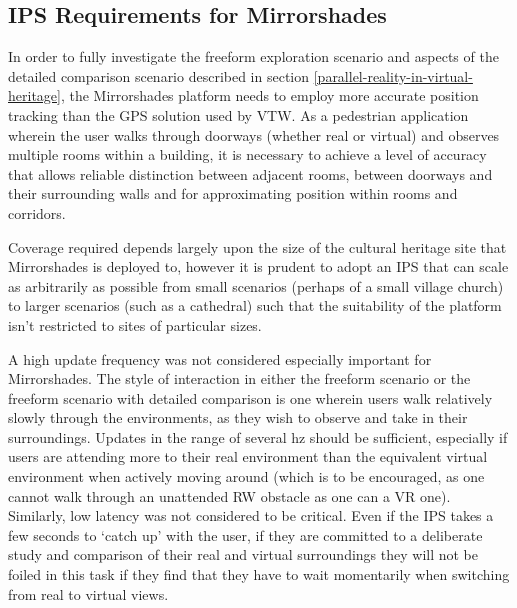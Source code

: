 
\subsection{IPS Requirements for Mirrorshades}
\label{ips-requirements-for-mirrorshades}
In order to fully investigate the freeform exploration scenario and aspects of the detailed comparison scenario described in section \ref{parallel-reality-in-virtual-heritage}, the Mirrorshades platform needs to employ more accurate position tracking than the GPS solution used by VTW. As a pedestrian application wherein the user walks through doorways (whether real or virtual) and observes multiple rooms within a building, it is necessary to achieve a level of accuracy that allows reliable distinction between adjacent rooms, between doorways and their surrounding walls and for approximating position within rooms and corridors.

Coverage required depends largely upon the size of the cultural heritage site that Mirrorshades is deployed to, however it is prudent to adopt an IPS that can scale as arbitrarily as possible from small scenarios (perhaps of a small village church) to larger scenarios (such as a cathedral) such that the suitability of the platform isn't restricted to sites of particular sizes.

A high update frequency was not considered especially important for Mirrorshades. The style of interaction in either the freeform scenario or the freeform scenario with detailed comparison is one wherein users walk relatively slowly through the environments, as they wish to observe and take in their surroundings. Updates in the range of several hz should be sufficient, especially if users are attending more to their real environment than the equivalent virtual environment when actively moving around (which is to be encouraged, as one cannot walk through an unattended RW obstacle as one can a VR one). Similarly, low latency was not considered to be critical. Even if the IPS takes a few seconds to `catch up' with the user, if they are committed to a deliberate study and comparison of their real and virtual surroundings they will not be foiled in this task if they find that they have to wait momentarily when switching from real to virtual views.

